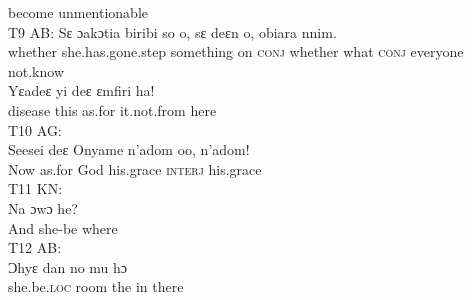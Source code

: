 \documentclass[output=paper,colorlinks,citecolor=brown]{langscibook}
\begin{document}
            become unmentionable \\
    \z
\ex\label{ex:obeng:9}
    T9 AB:
    \ea
    \gll    Sɛ ɔakɔtia biribi so o, sɛ deɛn o, obiara nnim. \\
            whether she.has.gone.step something on \textsc{conj} whether what \textsc{conj} everyone not.know\\
    \ex
    \gll    Yɛadeɛ yi deɛ ɛmfiri ha! \\
            disease this as.for it.not.from here \\
    \z
\ex\label{ex:obeng:10}
    T10 AG:\\
    \gll    Seesei deɛ Onyame n’adom oo, n’adom! \\
            Now as.for God his.grace \textsc{interj} his.grace\\
\ex\label{ex:obeng:11}
    T11 KN:\\
    \gll    Na ɔwɔ he?\\
            And she-be where\\
\ex\label{ex:obeng:12}
    T12 AB:\\
    \gll    Ɔhyɛ dan no mu hɔ \\
            she.be.\textsc{loc} room the in there\\
    \z
    
\end{document}
